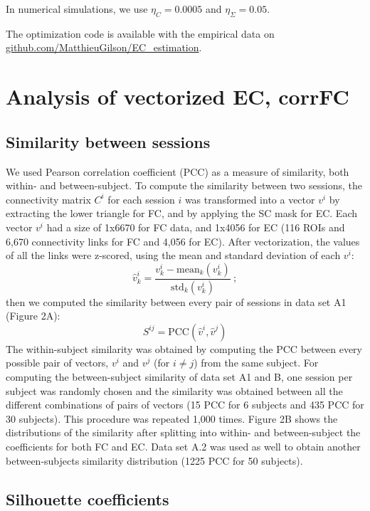 \documentclass{article}
\begin{document}
In numerical simulations, we use $\eta_C = 0.0005$ and $\eta_\Sigma = 0.05$.

The optimization code is available with the empirical data on \url{github.com/MatthieuGilson/EC_estimation}. 


\section{Analysis of vectorized EC, corrFC}

\subsection{Similarity between sessions}

We used Pearson correlation coefficient (PCC) as a measure of similarity, both within- and between-subject. To compute the similarity between two sessions, the connectivity matrix $C^i$ for each session $i$ was transformed into a vector $v^i$ by extracting the lower triangle for FC, and by applying the SC mask for EC. Each vector $v^i$ had a size of 1x6670 for FC data, and 1x4056 for EC (116 ROIs and 6,670 connectivity links for FC and 4,056 for EC). After vectorization, the values of all the links were z-scored, using the mean and standard deviation of each $v^i$:
\begin{equation}
\hat{v}^i_k = \frac{v^i_k - \mathrm{mean}_k(v^i_k)}{\mathrm{std}_k(v^i_k)}
\ ;
\end{equation}
then we computed the similarity between every pair of sessions in data set A1 (Figure 2A):
\begin{equation} \label{eq_simil}
S^{ij} = \mathrm{PCC}(\hat{v}^i,\hat{v}^j)
\end{equation}
The within-subject similarity was obtained by computing the PCC between every possible pair of vectors, $v^i$ and $v^j$ (for $i \neq j$) from the same subject. For computing the between-subject similarity of data set A1 and B, one session per subject was randomly chosen and the similarity was obtained between all the different combinations of pairs of vectors (15 PCC for 6 subjects and 435 PCC for 30 subjects). This procedure was repeated 1,000 times. Figure 2B shows the distributions of the similarity after splitting into within- and between-subject the coefficients for both FC and EC. Data set A.2 was used as well to obtain another between-subjects similarity distribution (1225 PCC for 50 subjects).

\subsection{Silhouette coefficients}
\end{document}
